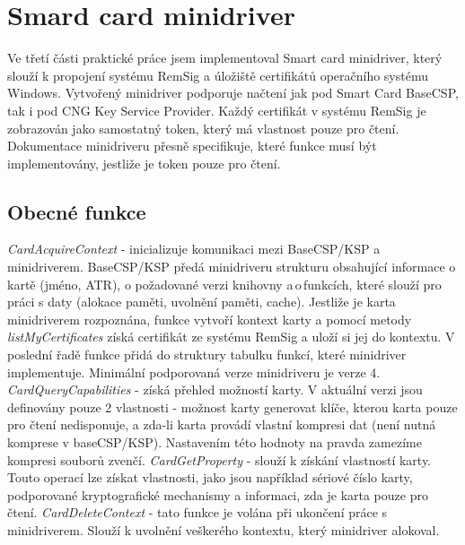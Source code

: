 \documentclass[]{fithesis3}
\begin{document}
	\section{Smard card minidriver}
	Ve třetí části praktické práce jsem implementoval Smart card minidriver, který slouží k propojení 	systému RemSig a úložiště certifikátů operačního systému Windows. Vytvořený minidriver 			podporuje načtení jak pod Smart Card BaseCSP, tak i pod CNG Key Service Provider. Každý 		certifikát v systému RemSig je zobrazován jako samostatný token, který má vlastnost pouze 		pro čtení. Dokumentace minidriveru přesně specifikuje, které funkce musí být implementovány, 		jestliže je token pouze pro čtení.

		\subsection{Obecné funkce}
		\textit{CardAcquireContext} - inicializuje komunikaci mezi BaseCSP/KSP a minidriverem. 			BaseCSP/KSP předá minidriveru strukturu obsahující informace o kartě (jméno, ATR), o 				požadované verzi knihovny a\,o\,funkcích, které slouží pro práci s daty (alokace paměti, 			uvolnění paměti, cache). Jestliže je karta minidriverem rozpoznána, funkce vytvoří 				kontext karty a pomocí metody \textit{listMyCertificates} získá certifikát ze systému 				RemSig a uloží si jej do kontextu. V poslední řadě funkce přidá do struktury tabulku funkcí, 			které minidriver implementuje. Minimální podporovaná verze minidriveru je verze 4.
		\newline
 		\newline
		\textit{CardQueryCapabilities} - získá přehled možností karty. V aktuální verzi jsou 				definovány pouze 2 vlastnosti - možnost karty generovat klíče, kterou karta pouze pro 			čtení nedisponuje, a zda-li karta provádí vlastní kompresi dat (není nutná komprese v 				baseCSP/KSP). Nastavením této hodnoty na pravda zamezíme kompresi souborů zvenčí.
		\newline
 		\newline
		\textit{CardGetProperty} - slouží k získání vlastností karty. Touto operací lze získat 				vlastnosti, jako jsou například sériové číslo karty, podporované kryptografické mechanismy 			a informaci, zda je karta pouze pro čtení.
		\newline
 		\newline
		\textit{CardDeleteContext} - tato funkce je volána při ukončení práce s minidriverem. 				Slouží k uvolnění veškerého kontextu, který minidriver alokoval.
\end{document}
